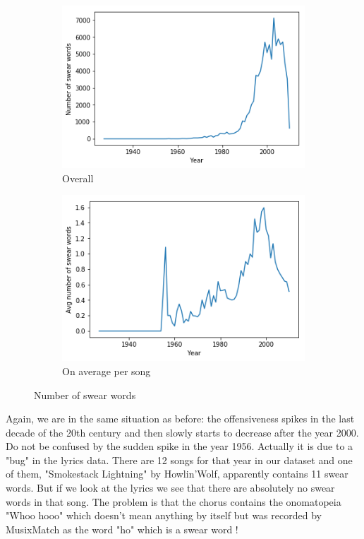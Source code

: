 \documentclass[11pt]{article}
\begin{document}
\begin{figure}
\centering
\begin{subfigure}[b]{0.45\textwidth}
\includegraphics[width=\textwidth]{plots/nb_words}
\caption{Overall}
\label{nb_words}
\end{subfigure}
\quad
\begin{subfigure}[b]{0.45\textwidth}
\includegraphics[width=\textwidth]{plots/nb_words_avg}
\caption{On average per song}
\label{nb_words_avg}
\end{subfigure}
\caption{Number of swear words}
\end{figure}

Again, we are in the same situation as before: the offensiveness spikes in the last decade of the 20th century and then slowly starts to decrease after the year 2000. Do not be confused by the sudden spike in the year 1956. Actually it is due to a "bug" in the lyrics data. There are 12 songs for that year in our dataset and one of them, "Smokestack Lightning" by Howlin'Wolf, apparently contains 11 swear words. But if we look at the lyrics we see that there are absolutely no swear words in that song. The problem is that the chorus contains the onomatopeia "Whoo hooo" which doesn't mean anything by itself but was recorded by MusixMatch as the word "ho" which is a swear word !
\end{document}
